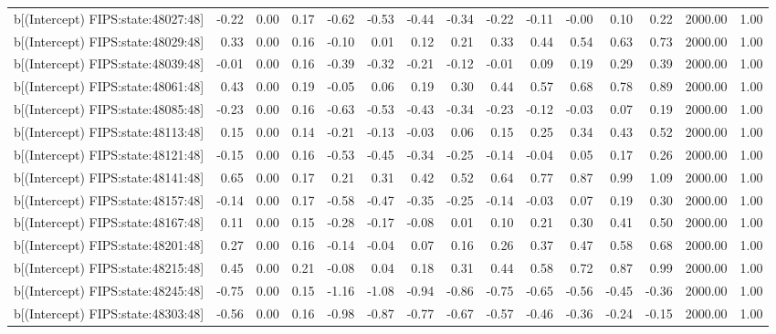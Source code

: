 \begin{table}[ht]
\begin{tabular}{rrrrrrrrrrrrrrr}
  b[(Intercept) FIPS:state:48027:48] & -0.22 & 0.00 & 0.17 & -0.62 & -0.53 & -0.44 & -0.34 & -0.22 & -0.11 & -0.00 & 0.10 & 0.22 & 2000.00 & 1.00 \\ 
  b[(Intercept) FIPS:state:48029:48] & 0.33 & 0.00 & 0.16 & -0.10 & 0.01 & 0.12 & 0.21 & 0.33 & 0.44 & 0.54 & 0.63 & 0.73 & 2000.00 & 1.00 \\ 
  b[(Intercept) FIPS:state:48039:48] & -0.01 & 0.00 & 0.16 & -0.39 & -0.32 & -0.21 & -0.12 & -0.01 & 0.09 & 0.19 & 0.29 & 0.39 & 2000.00 & 1.00 \\ 
  b[(Intercept) FIPS:state:48061:48] & 0.43 & 0.00 & 0.19 & -0.05 & 0.06 & 0.19 & 0.30 & 0.44 & 0.57 & 0.68 & 0.78 & 0.89 & 2000.00 & 1.00 \\ 
  b[(Intercept) FIPS:state:48085:48] & -0.23 & 0.00 & 0.16 & -0.63 & -0.53 & -0.43 & -0.34 & -0.23 & -0.12 & -0.03 & 0.07 & 0.19 & 2000.00 & 1.00 \\ 
  b[(Intercept) FIPS:state:48113:48] & 0.15 & 0.00 & 0.14 & -0.21 & -0.13 & -0.03 & 0.06 & 0.15 & 0.25 & 0.34 & 0.43 & 0.52 & 2000.00 & 1.00 \\ 
  b[(Intercept) FIPS:state:48121:48] & -0.15 & 0.00 & 0.16 & -0.53 & -0.45 & -0.34 & -0.25 & -0.14 & -0.04 & 0.05 & 0.17 & 0.26 & 2000.00 & 1.00 \\ 
  b[(Intercept) FIPS:state:48141:48] & 0.65 & 0.00 & 0.17 & 0.21 & 0.31 & 0.42 & 0.52 & 0.64 & 0.77 & 0.87 & 0.99 & 1.09 & 2000.00 & 1.00 \\ 
  b[(Intercept) FIPS:state:48157:48] & -0.14 & 0.00 & 0.17 & -0.58 & -0.47 & -0.35 & -0.25 & -0.14 & -0.03 & 0.07 & 0.19 & 0.30 & 2000.00 & 1.00 \\ 
  b[(Intercept) FIPS:state:48167:48] & 0.11 & 0.00 & 0.15 & -0.28 & -0.17 & -0.08 & 0.01 & 0.10 & 0.21 & 0.30 & 0.41 & 0.50 & 2000.00 & 1.00 \\ 
  b[(Intercept) FIPS:state:48201:48] & 0.27 & 0.00 & 0.16 & -0.14 & -0.04 & 0.07 & 0.16 & 0.26 & 0.37 & 0.47 & 0.58 & 0.68 & 2000.00 & 1.00 \\ 
  b[(Intercept) FIPS:state:48215:48] & 0.45 & 0.00 & 0.21 & -0.08 & 0.04 & 0.18 & 0.31 & 0.44 & 0.58 & 0.72 & 0.87 & 0.99 & 2000.00 & 1.00 \\ 
  b[(Intercept) FIPS:state:48245:48] & -0.75 & 0.00 & 0.15 & -1.16 & -1.08 & -0.94 & -0.86 & -0.75 & -0.65 & -0.56 & -0.45 & -0.36 & 2000.00 & 1.00 \\ 
  b[(Intercept) FIPS:state:48303:48] & -0.56 & 0.00 & 0.16 & -0.98 & -0.87 & -0.77 & -0.67 & -0.57 & -0.46 & -0.36 & -0.24 & -0.15 & 2000.00 & 1.00 \\ 

\end{tabular}
\end{table}
